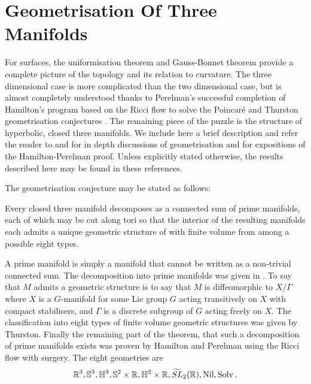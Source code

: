 \documentclass[a4paper,12pt]{amsart}
\begin{document}
\section{Geometrisation Of Three Manifolds}
\label{sec:geometrisation}

For surfaces, the uniformisation theorem and Gauss-Bonnet theorem provide a complete picture of the topology and its relation to curvature. The three dimensional case is more complicated than the two dimensional case, but is almost completely understood thanks to Perelman's successful completion \cite{2003math......7245P,2003math......3109P,2002math.....11159P} of Hamilton's program based on the Ricci flow \cite{Hamilton:/1982} to solve the Poincar\'e and Thurston geometrisation conjectures \cite{MR648524}. The remaining piece of the puzzle is the structure of hyperbolic, closed three manifolds. We include here a brief description and refer the reader to \cite{MR705527} and \cite{MR1435975} for in depth discussions of geometrisation and \cite{MR3186136,MR2334563,MR2460872} for expositions of the Hamilton-Perelman proof. Unless explicitly stated otherwise, the results described here may be found in these references.

The geometrisation conjecture may be stated as follows:

\begin{thm}
\label{thm:geometrisation}

Every closed three manifold decomposes as a connected sum of prime manifolds, each of which may be cut along tori so that the interior of the resulting manifolds each admits a unique geometric structure of with finite volume from among a possible eight types.
\end{thm}

A prime manifold is simply a manifold that cannot be written as a non-trivial connected sum. The decomposition into prime manifolds was given in \cite{MR0142125}. To say that \(M\) admits a geometric structure is to say that \(M\) is diffeomorphic to \(X/\Gamma\) where \(X\) is a \(G\)-manifold for some Lie group \(G\) acting transitively on \(X\) with compact stabilisers, and \(\Gamma\) is a discrete subgroup of \(G\) acting freely on \(X\). The classification into eight types of finite volume geometric structures was given by Thurston. Finally the remaining part of the theorem, that such a decomposition of prime manifolds exists was proven by Hamilton and Perelman using the Ricci flow with surgery. The eight geometries are
\[
\mathbb{R}^3, \mathbb{S}^3, \mathbb{H}^3, \mathbb{S}^2 \times \mathbb{R}, \mathbb{H}^2 \times \mathbb{R}, \widetilde{SL}_2(\mathbb{R}), \operatorname{Nil}, \operatorname{Solv}.
\]
\end{document}
